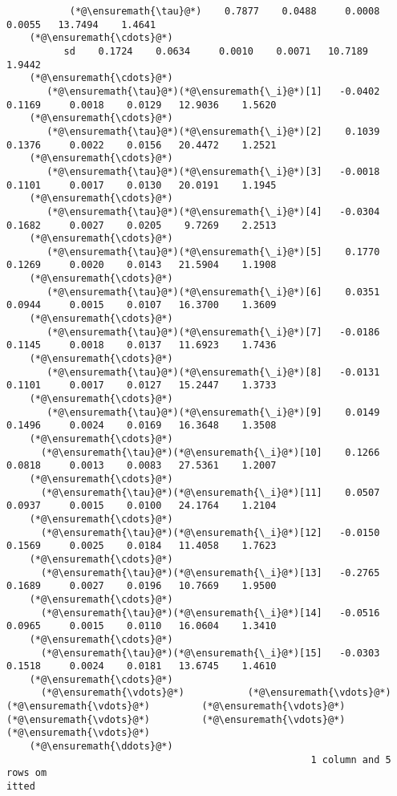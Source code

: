 \documentclass[12pt,a4paper]{article}
\begin{document}
\begin{lstlisting}
           (*@\ensuremath{\tau}@*)    0.7877    0.0488     0.0008    0.0055   13.7494    1.4641  
    (*@\ensuremath{\cdots}@*)
          sd    0.1724    0.0634     0.0010    0.0071   10.7189    1.9442  
    (*@\ensuremath{\cdots}@*)
       (*@\ensuremath{\tau}@*)(*@\ensuremath{\_i}@*)[1]   -0.0402    0.1169     0.0018    0.0129   12.9036    1.5620  
    (*@\ensuremath{\cdots}@*)
       (*@\ensuremath{\tau}@*)(*@\ensuremath{\_i}@*)[2]    0.1039    0.1376     0.0022    0.0156   20.4472    1.2521  
    (*@\ensuremath{\cdots}@*)
       (*@\ensuremath{\tau}@*)(*@\ensuremath{\_i}@*)[3]   -0.0018    0.1101     0.0017    0.0130   20.0191    1.1945  
    (*@\ensuremath{\cdots}@*)
       (*@\ensuremath{\tau}@*)(*@\ensuremath{\_i}@*)[4]   -0.0304    0.1682     0.0027    0.0205    9.7269    2.2513  
    (*@\ensuremath{\cdots}@*)
       (*@\ensuremath{\tau}@*)(*@\ensuremath{\_i}@*)[5]    0.1770    0.1269     0.0020    0.0143   21.5904    1.1908  
    (*@\ensuremath{\cdots}@*)
       (*@\ensuremath{\tau}@*)(*@\ensuremath{\_i}@*)[6]    0.0351    0.0944     0.0015    0.0107   16.3700    1.3609  
    (*@\ensuremath{\cdots}@*)
       (*@\ensuremath{\tau}@*)(*@\ensuremath{\_i}@*)[7]   -0.0186    0.1145     0.0018    0.0137   11.6923    1.7436  
    (*@\ensuremath{\cdots}@*)
       (*@\ensuremath{\tau}@*)(*@\ensuremath{\_i}@*)[8]   -0.0131    0.1101     0.0017    0.0127   15.2447    1.3733  
    (*@\ensuremath{\cdots}@*)
       (*@\ensuremath{\tau}@*)(*@\ensuremath{\_i}@*)[9]    0.0149    0.1496     0.0024    0.0169   16.3648    1.3508  
    (*@\ensuremath{\cdots}@*)
      (*@\ensuremath{\tau}@*)(*@\ensuremath{\_i}@*)[10]    0.1266    0.0818     0.0013    0.0083   27.5361    1.2007  
    (*@\ensuremath{\cdots}@*)
      (*@\ensuremath{\tau}@*)(*@\ensuremath{\_i}@*)[11]    0.0507    0.0937     0.0015    0.0100   24.1764    1.2104  
    (*@\ensuremath{\cdots}@*)
      (*@\ensuremath{\tau}@*)(*@\ensuremath{\_i}@*)[12]   -0.0150    0.1569     0.0025    0.0184   11.4058    1.7623  
    (*@\ensuremath{\cdots}@*)
      (*@\ensuremath{\tau}@*)(*@\ensuremath{\_i}@*)[13]   -0.2765    0.1689     0.0027    0.0196   10.7669    1.9500  
    (*@\ensuremath{\cdots}@*)
      (*@\ensuremath{\tau}@*)(*@\ensuremath{\_i}@*)[14]   -0.0516    0.0965     0.0015    0.0110   16.0604    1.3410  
    (*@\ensuremath{\cdots}@*)
      (*@\ensuremath{\tau}@*)(*@\ensuremath{\_i}@*)[15]   -0.0303    0.1518     0.0024    0.0181   13.6745    1.4610  
    (*@\ensuremath{\cdots}@*)
      (*@\ensuremath{\vdots}@*)           (*@\ensuremath{\vdots}@*)         (*@\ensuremath{\vdots}@*)         (*@\ensuremath{\vdots}@*)          (*@\ensuremath{\vdots}@*)         (*@\ensuremath{\vdots}@*)         (*@\ensuremath{\vdots}@*)     
    (*@\ensuremath{\ddots}@*)
                                                     1 column and 5 rows om
itted


\end{lstlisting}
\end{document}
